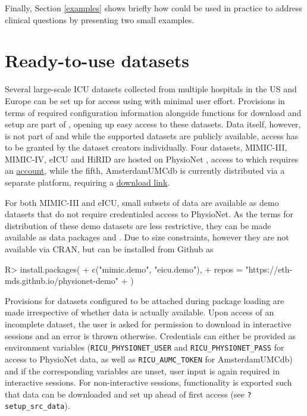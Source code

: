 \documentclass[
  notitle]{jss}
\begin{document}
Finally, Section \ref{examples} shows briefly how  could be
used in practice to address clinical questions by presenting two small
examples.

\hypertarget{ready-to-use-datasets}{%
\section{Ready-to-use datasets}\label{ready-to-use-datasets}}

Several large-scale ICU datasets collected from multiple hospitals in
the US and Europe can be set up for access using  with minimal
user effort. Provisions in terms of required configuration information
alongside functions for download and setup are part of ,
opening up easy access to these datasets. Data itself, however, is not
part of  and while the supported datasets are publicly
available, access has to be granted by the dataset creators
individually. Four datasets, MIMIC-III, MIMIC-IV, eICU and HiRID are
hosted on PhysioNet \citep{goldberger2000}, access to which requires an
\href{https://physionet.org/register/}{account}, while the fifth,
AmsterdamUMCdb is currently distributed via a separate platform,
requiring a
\href{https://amsterdammedicaldatascience.nl/\#amsterdamumcdb}{download
link}.

For both MIMIC-III and eICU, small subsets of data are available as demo
datasets that do not require credentialed access to PhysioNet. As the
terms for distribution of these demo datasets are less restrictive, they
can be made available as data packages  and
. Due to size constraints, however they are not available
via CRAN, but can be installed from Github as

\begin{CodeChunk}
\begin{CodeInput}
R> install.packages(
+   c("mimic.demo", "eicu.demo"),
+   repos = "https://eth-mds.github.io/physionet-demo"
+ )
\end{CodeInput}
\end{CodeChunk}

Provisions for datasets configured to be attached during package loading
are made irrespective of whether data is actually available. Upon access
of an incomplete dataset, the user is asked for permission to download
in interactive sessions and an error is thrown otherwise. Credentials
can either be provided as environment variables
(\texttt{RICU\_PHYSIONET\_USER} and \texttt{RICU\_PHYSIONET\_PASS} for
access to PhysioNet data, as well as \texttt{RICU\_AUMC\_TOKEN} for
AmsterdamUMCdb) and if the corresponding variables are unset, user input
is again required in interactive sessions. For non-interactive sessions,
functionality is exported such that data can be downloaded and set up
ahead of first access (see \texttt{?setup\_src\_data}).
\end{document}
